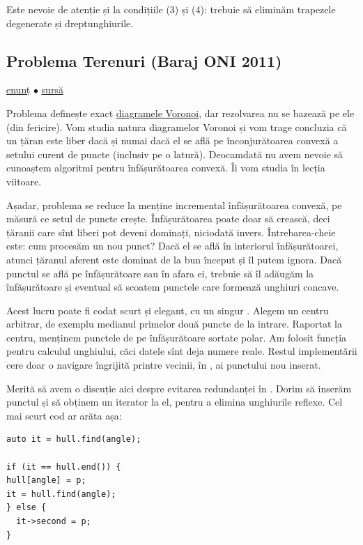 \documentclass[../main.tex]{subfiles}
\begin{document}
Este nevoie de atenție și la condițiile (3) și (4): trebuie să eliminăm trapezele degenerate și dreptunghiurile.

\subsection{Problema Terenuri (Baraj ONI 2011)}
\label{problem:terenuri}

\href{https://kilonova.ro/problems/406}{enunț}
$\bullet$
\hyperref[code:terenuri]{sursă}

Problema definește exact \href{https://en.wikipedia.org/wiki/Voronoi_diagram}{diagramele Voronoi}, dar rezolvarea nu se bazează pe ele (din fericire). Vom studia natura diagramelor Voronoi și vom trage concluzia că un țăran este liber dacă și numai dacă el se află pe înconjurătoarea convexă a setului curent de puncte (inclusiv pe o latură). Deocamdată nu avem nevoie să cunoaștem algoritmi pentru înfășurătoarea convexă. Îi vom studia în lecția viitoare.

Așadar, problema se reduce la menține incremental înfășurătoarea convexă, pe măsură ce setul de puncte crește. Înfășurătoarea poate doar să crească, deci țăranii care sînt liberi pot deveni dominați, niciodată invers. Întrebarea-cheie este: cum procesăm un nou punct? Dacă el se află în interiorul înfășurătoarei, atunci țăranul aferent este dominat de la bun început și îl putem ignora. Dacă punctul se află pe înfășurătoare sau în afara ei, trebuie să îl adăugăm la înfășurătoare și eventual să scoatem punctele care formează unghiuri concave.

Acest lucru poate fi codat scurt și elegant, cu un singur . Alegem un centru arbitrar, de exemplu medianul primelor două puncte de la intrare. Raportat la centru, menținem punctele de pe înfășurătoare sortate polar. Am folosit funcția  pentru calculul unghiului, căci datele sînt deja numere reale. Restul implementării cere doar o navigare îngrijită printre vecinii, în , ai punctului nou inserat.

Merită să avem o discuție aici despre evitarea redundanței în . Dorim să inserăm punctul și să obținem un iterator la el, pentru a elimina unghiurile reflexe. Cel mai scurt cod ar arăta așa:

\begin{verbatim}
auto it = hull.find(angle);

if (it == hull.end()) {
hull[angle] = p;
it = hull.find(angle);
} else {
  it->second = p;
}
\end{verbatim}
\end{document}
